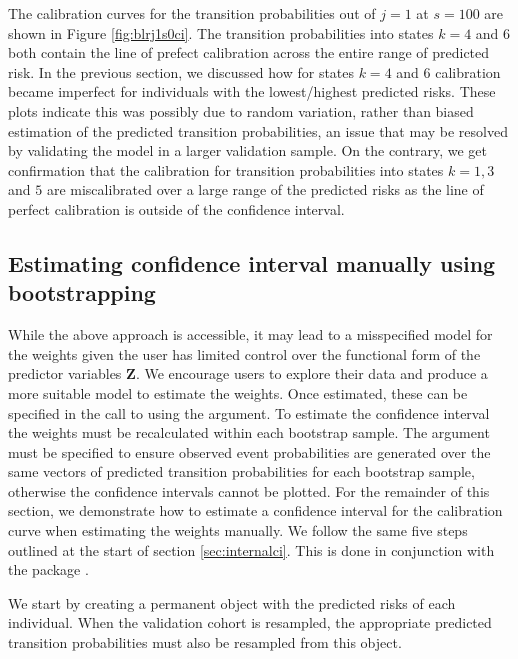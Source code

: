 \documentclass[nojss]{jss}
\begin{document}
The calibration curves for the transition probabilities out of $j = 1$ at $s = 100$ are shown in Figure \ref{fig:blrj1s0ci}. The transition probabilities into states $k = 4$ and $6$ both contain the line of prefect calibration across the entire range of predicted risk. In the previous section, we discussed how for states $k = 4$ and $6$ calibration became imperfect for individuals with the lowest/highest predicted risks. These plots indicate this was possibly due to random variation, rather than biased estimation of the predicted transition probabilities, an issue that may be resolved by validating the model in a larger validation sample. On the contrary, we get confirmation that the calibration for transition probabilities into states $k = 1, 3$ and $5$ are miscalibrated over a large range of the predicted risks as the line of perfect calibration is outside of the confidence interval.

\subsection{Estimating confidence interval manually using bootstrapping} \label{sec:manualci}

While the above approach is accessible, it may lead to a misspecified model for the  weights given the user has limited control over the functional form of the predictor variables $\textbf{Z}$. We encourage users to explore their data and produce a more suitable model to estimate the weights. Once estimated, these can be specified in the call to  using the  argument. To estimate the confidence interval the weights must be recalculated within each bootstrap sample. The  argument must be specified to ensure observed event probabilities are generated over the same vectors of predicted transition probabilities for each bootstrap sample, otherwise the confidence intervals cannot be plotted. For the remainder of this section, we demonstrate how to estimate a confidence interval for the calibration curve when estimating the weights manually. We follow the same five steps outlined at the start of section \ref{sec:internalci}. This is done in conjunction with the  package \citep{Canty2022}.

We start by creating a permanent object with the predicted risks of each individual. When the validation cohort  is resampled, the appropriate predicted transition probabilities must also be resampled from this object.
\end{document}

